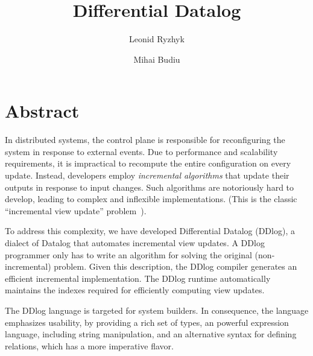 \documentclass{svproc}
\author{
        Leonid Ryzhyk \and
        Mihai Budiu}
\institute{VMware Research}
\title{Differential Datalog}
\date{}
\begin{document}
\maketitle

\section{Abstract}

In distributed systems, the control plane is responsible for
reconfiguring the system in response to external events.  Due to
performance and scalability requirements, it is impractical to
recompute the entire configuration on every update.  Instead,
developers employ \emph{incremental algorithms} that update their
outputs in response to input changes.  Such algorithms are notoriously
hard to develop, leading to complex and inflexible implementations.
(This is the classic ``incremental view update''
problem~\cite{Gupta-sigmod93}).

To address this complexity, we have developed Differential Datalog
(DDlog), a dialect of Datalog that automates incremental view updates.
A DDlog programmer only has to write an algorithm for solving the
original (non-incremental) problem.  Given this description, the DDlog
compiler generates an efficient incremental implementation.  The DDlog
runtime automatically maintains the indexes required for efficiently
computing view updates.

The DDlog language is targeted for system builders.  In consequence,
the language emphasizes usability, by providing a rich set of types,
an powerful expression language, including string manipulation, and
an alternative syntax for defining relations, which has a more
imperative flavor.










\end{document}
